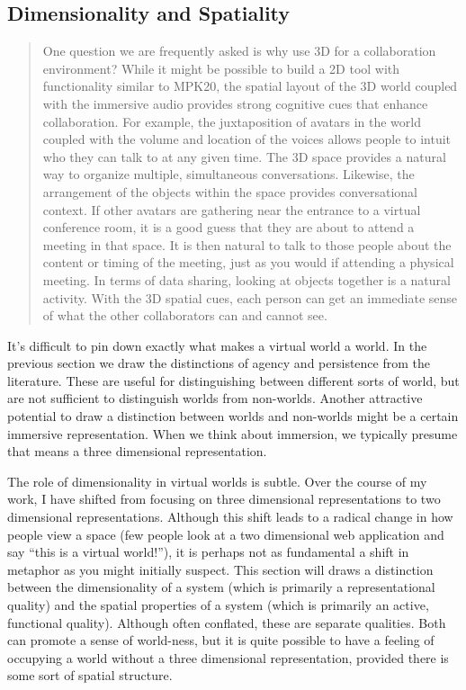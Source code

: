 \subsection{Dimensionality and Spatiality}
\begin{quotation}
One question we are frequently asked is why use 3D for a collaboration environment? While it might be possible to build a 2D tool with functionality similar to MPK20, the spatial layout of the 3D world coupled with the immersive audio provides strong cognitive cues that enhance collaboration. For example, the juxtaposition of avatars in the world coupled with the volume and location of the voices allows people to intuit who they can talk to at any given time. The 3D space provides a natural way to organize multiple, simultaneous conversations. Likewise, the arrangement of the objects within the space provides conversational context. If other avatars are gathering near the entrance to a virtual conference room, it is a good guess that they are about to attend a meeting in that space. It is then natural to talk to those people about the content or timing of the meeting, just as you would if attending a physical meeting. In terms of data sharing, looking at objects together is a natural activity. With the 3D spatial cues, each person can get an immediate sense of what the other collaborators can and cannot see.\citep{Anonymous:tv}
\end{quotation}

It's difficult to pin down exactly what makes a virtual world a world. In the previous section we draw the distinctions of agency and persistence from the literature. These are useful for distinguishing between different sorts of world, but are not sufficient to distinguish worlds from non-worlds. Another attractive potential to draw a distinction between worlds and non-worlds might be a certain immersive representation. When we think about immersion, we typically presume that means a three dimensional representation. 

The role of dimensionality in virtual worlds is subtle. Over the course of my work, I have shifted from focusing on three dimensional representations to two dimensional representations. Although this shift leads to a radical change in how people view a space (few people look at a two dimensional web application and say ``this is a virtual world!''), it is perhaps not as fundamental a shift in metaphor as you might initially suspect. This section will draws a distinction between the dimensionality of a system (which is primarily a representational quality) and the spatial properties of a system (which is primarily an active, functional quality). Although often conflated, these are separate qualities. Both can promote a sense of world-ness, but it is quite possible to have a feeling of occupying a world without a three dimensional representation, provided there is some sort of spatial structure.

